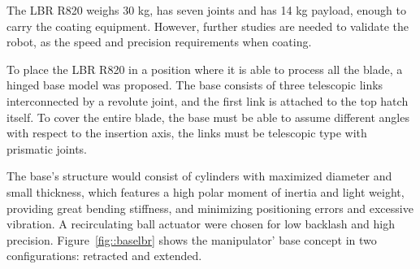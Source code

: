 

The LBR R820 weighs 30 kg, has seven joints and has 14 kg payload, enough to
carry the coating equipment. However, further studies are needed to validate
the robot, as the speed and precision requirements when coating.


To place the LBR R820 in a position where it is able to process all the
blade, a hinged base model was proposed. The base consists of three telescopic
links interconnected by a revolute joint, and the first link is attached to the
top hatch itself. To cover the entire blade, the base must be able to assume different angles with
respect to the insertion axis, the links must be telescopic type with
prismatic joints.  

The base's structure would consist of cylinders with maximized diameter and
small thickness, which features a high polar moment of inertia and light weight,
providing great bending stiffness, and minimizing positioning errors and
excessive vibration. A recirculating ball actuator were chosen for low
backlash and high precision. Figure~\ref{fig::baselbr} shows the manipulator'
base concept in two configurations: retracted and extended.



